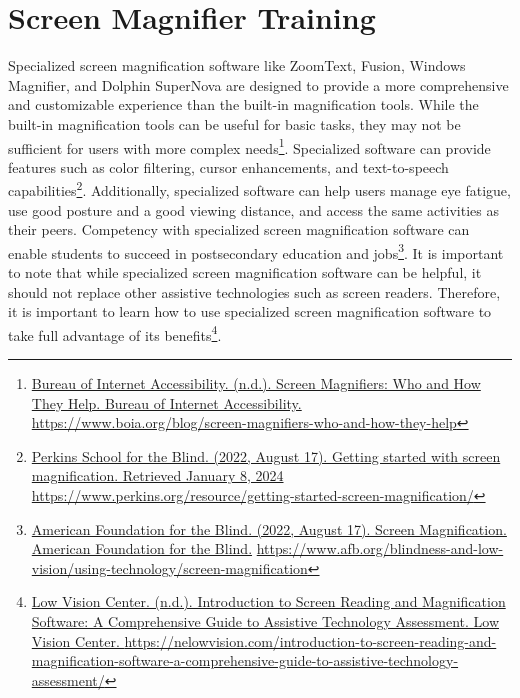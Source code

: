\pagebreak\hypertarget{appx11}{}\section[Screen Magnifier Training]{Screen Magnifier Training}\label{appx11}
Specialized screen magnification software like ZoomText, Fusion, Windows Magnifier, and Dolphin SuperNova are designed to provide a more comprehensive and customizable experience than the built-in magnification tools. While the built-in magnification tools can be useful for basic tasks, they may not be sufficient for users with more complex needs\footnote{\raggedright \href{https://www.boia.org/blog/screen-magnifiers-who-and-how-they-help}{Bureau of Internet Accessibility. (n.d.). Screen Magnifiers: Who and How They Help. Bureau of Internet Accessibility. } \break\url{https://www.boia.org/blog/screen-magnifiers-who-and-how-they-help}}. Specialized software can provide features such as color filtering, cursor enhancements, and text-to-speech capabilities\footnote{\raggedright \href{https://www.perkins.org/resource/getting-started-screen-magnification/}{Perkins School for the Blind. (2022, August 17). Getting started with screen magnification. Retrieved January 8, 2024} \url{https://www.perkins.org/resource/getting-started-screen-magnification/}}. Additionally, specialized software can help users manage eye fatigue, use good posture and a good viewing distance, and access the same activities as their peers. Competency with specialized screen magnification software can enable students to succeed in postsecondary education and jobs\footnote{\raggedright \href{https://www.afb.org/blindness-and-low-vision/using-technology/screen-magnification}{American Foundation for the Blind. (2022, August 17). Screen Magnification. American Foundation for the Blind.} \break\url{https://www.afb.org/blindness-and-low-vision/using-technology/screen-magnification}}. It is important to note that while specialized screen magnification software can be helpful, it should not replace other assistive technologies such as screen readers. Therefore, it is important to learn how to use specialized screen magnification software to take full advantage of its benefits\footnotemark[\value{footnote}]\fnsep\footnote{\raggedright \href{https://nelowvision.com/introduction-to-screen-reading-and-magnification-software-a-comprehensive-guide-to-assistive-technology-assessment/}{Low Vision Center. (n.d.). Introduction to Screen Reading and Magnification Software: A Comprehensive Guide to Assistive Technology Assessment. Low Vision Center. } \break\url{https://nelowvision.com/introduction-to-screen-reading-and-magnification-software-a-comprehensive-guide-to-assistive-technology-assessment/}}.

